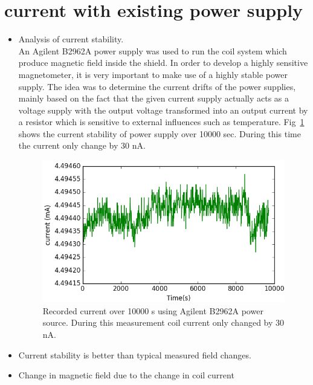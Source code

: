    \section{current with existing power supply}
   \begin{itemize}
   \item Analysis of current stability.\\
 An Agilent B2962A power supply was used to run the coil system which produce magnetic field inside the shield. In order to develop a highly sensitive magnetometer, it is very important to make use of a highly stable power supply. The idea was to determine the current drifts of the power supplies, mainly based on the fact that the given current supply actually acts as a voltage supply with the output voltage transformed into an output current by a resistor which is sensitive to external influences such as temperature. Fig~\ref{fig:current} shows the current stability of power supply over 10000 sec. During this time the current only change by 30 nA.  
   \begin{figure}[h]
\centering
\includegraphics[width=0.8\linewidth]{figures/current}
\caption{Recorded current over 10000 s using Agilent B2962A power source. During this measurement coil current only changed by 30 nA.\label{fig:current} }
\end{figure}
   \item Current stability is better than typical measured field changes.
   \item Change in magnetic field due to the change in coil current\\

\end{itemize}

